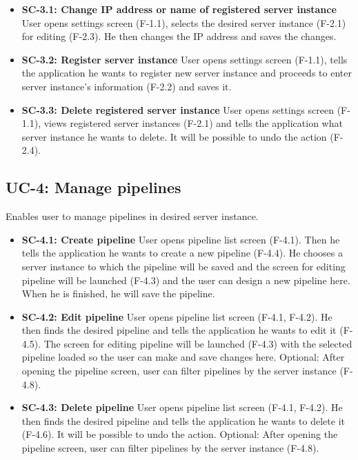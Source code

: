 \begin{itemize}
\item \textbf{SC-3.1: Change IP address or name of registered server instance}
User opens settings screen (F-1.1), selects the desired server instance (F-2.1) for editing (F-2.3). He then changes the IP address and saves the changes.

\item \textbf{SC-3.2: Register server instance}
User opens settings screen (F-1.1), tells the application he wants to register new server instance and proceeds to enter server instance's information (F-2.2) and saves it.

\item \textbf{SC-3.3: Delete registered server instance}
User opens settings screen (F-1.1), views registered server instances (F-2.1) and tells the application what server instance he wants to delete. It will be possible to undo the action (F-2.4).

\end{itemize}

\subsection*{UC-4: Manage pipelines}
Enables user to manage pipelines in desired server instance.

\begin{itemize}
\item \textbf{SC-4.1: Create pipeline}
User opens pipeline list screen (F-4.1). Then he tells the application he wants to create a new pipeline (F-4.4). He chooses a server instance to which the pipeline will be saved and the screen for editing pipeline will be launched (F-4.3) and the user can design a new pipeline here. When he is finished, he will save the pipeline.

\item \textbf{SC-4.2: Edit pipeline}
User opens pipeline list screen (F-4.1, F-4.2). He then finds the desired pipeline and tells the application he wants to edit it (F-4.5). The screen for editing pipeline will be launched (F-4.3) with the selected pipeline loaded so the user can make and save changes here. Optional: After opening the pipeline screen, user can filter pipelines by the server instance (F-4.8).

\item \textbf{SC-4.3: Delete pipeline}
User opens pipeline list screen (F-4.1, F-4.2). He then finds the desired pipeline and tells the application he wants to delete it (F-4.6). It will be possible to undo the action. Optional: After opening the pipeline screen, user can filter pipelines by the server instance (F-4.8).

\end{itemize}

